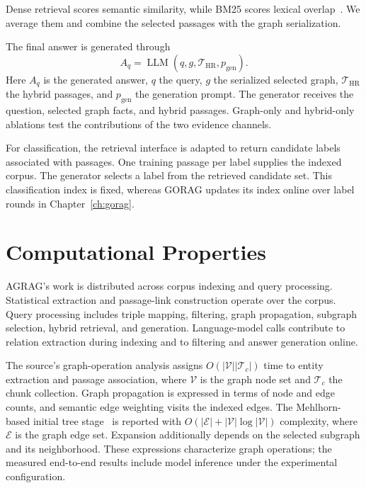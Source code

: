 Dense retrieval scores semantic similarity, while BM25 scores lexical overlap~\cite{agrag-robertson2009probabilistic}. We average them and combine the selected passages with the graph serialization.

The final answer is generated through
\begin{equation}
A_q=\operatorname{LLM}(q,g,\mathcal{T}_{\mathrm{HR}},p_{\mathrm{gen}}).
\label{eq:agrag:generation}
\end{equation}
Here $A_q$ is the generated answer, $q$ the query, $g$ the serialized selected graph, $\mathcal T_{\mathrm{HR}}$ the hybrid passages, and $p_{\mathrm{gen}}$ the generation prompt. The generator receives the question, selected graph facts, and hybrid passages. Graph-only and hybrid-only ablations test the contributions of the two evidence channels.

For classification, the retrieval interface is adapted to return candidate labels associated with passages. One training passage per label supplies the indexed corpus. The generator selects a label from the retrieved candidate set. This classification index is fixed, whereas GORAG updates its index online over label rounds in Chapter~\ref{ch:gorag}.

\section{Computational Properties}
\label{sec:agrag:complexity}
AGRAG's work is distributed across corpus indexing and query processing. Statistical extraction and passage-link construction operate over the corpus. Query processing includes triple mapping, filtering, graph propagation, subgraph selection, hybrid retrieval, and generation. Language-model calls contribute to relation extraction during indexing and to filtering and answer generation online.

The source's graph-operation analysis assigns $O(|\mathcal{V}||\mathcal{T}_c|)$ time to entity extraction and passage association, where $\mathcal V$ is the graph node set and $\mathcal T_c$ the chunk collection. Graph propagation is expressed in terms of node and edge counts, and semantic edge weighting visits the indexed edges. The Mehlhorn-based initial tree stage~\cite{agrag-mehlhorn1988faster} is reported with $O(|\mathcal{E}|+|\mathcal{V}|\log|\mathcal{V}|)$ complexity, where $\mathcal E$ is the graph edge set. Expansion additionally depends on the selected subgraph and its neighborhood. These expressions characterize graph operations; the measured end-to-end results include model inference under the experimental configuration.

